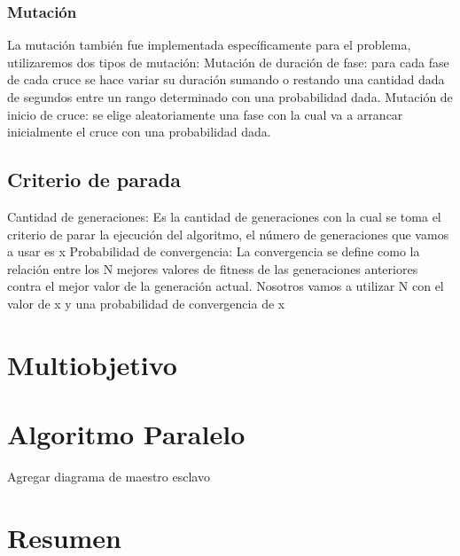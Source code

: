 \subsubsection{Mutación}
La  mutación también fue  implementada  específicamente para
el problema, utilizaremos dos tipos de mutación:
Mutación de duración de fase: para cada fase de cada cruce se
hace variar su duración sumando o restando una cantidad dada
de segundos entre un rango determinado con una probabilidad
dada.
Mutación de inicio de cruce: se elige aleatoriamente una fase
con  la  cual  va  a  arrancar  inicialmente  el  cruce  con  una
probabilidad dada.

\subsection{Criterio de parada}
 Cantidad  de  generaciones:  Es  la  cantidad  de
 generaciones  con  la  cual  se  toma  el  criterio  de  parar  la
 ejecución del algoritmo, el número de generaciones que vamos
 a usar es x
 Probabilidad  de  convergencia:  La  convergencia  se
 define como la relación entre los N mejores valores de fitness
 de  las  generaciones  anteriores  contra  el  mejor  valor  de  la
 generación actual. Nosotros vamos a utilizar N con el valor de
 x y una probabilidad de convergencia de x




\section{Multiobjetivo}

\section{Algoritmo Paralelo}
Agregar diagrama de maestro esclavo



\section{Resumen}